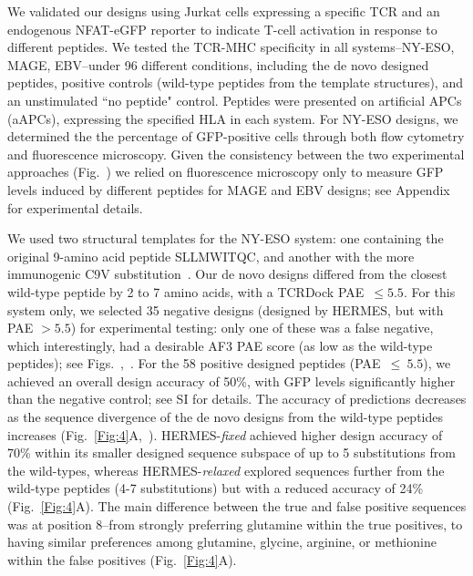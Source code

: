 We validated our designs using Jurkat cells expressing {a specific} TCR {and an endogenous}
NFAT-eGFP reporter to indicate T-cell activation in response to different peptides. We tested the
TCR-MHC specificity in all systems--NY-ESO, MAGE, EBV--under 96 different conditions, including the
{de novo} designed peptides, positive controls (wild-type peptides from the template structures),
and an unstimulated ``no peptide" control. Peptides were presented on artificial APCs (aAPCs),
expressing the specified HLA in each system. For NY-ESO designs, we determined the {the percentage
of GFP-positive cells} through both flow cytometry and fluorescence microscopy. Given the
consistency between the two experimental approaches (Fig.~\FlowMicroscopyFigure) we relied on
fluorescence microscopy only to measure GFP levels induced by different peptides for MAGE and EBV
designs; see Appendix for experimental details.

We used two structural templates for the NY-ESO system: one containing the original 9-amino acid
peptide SLLMWITQC, and another with the more immunogenic C9V
substitution~\cite{Chen2000-vq,Chen2005-jk}. Our {de novo} designs differed from the closest
wild-type peptide by 2 to 7 amino acids, with a TCRDock PAE~$\leq 5.5$. For this system only, we
selected 35 negative designs (designed by HERMES, but with PAE $> 5.5$) for experimental testing:
only one of these was a false negative, which interestingly, had a desirable AF3 PAE score (as low
as the wild-type peptides); see Figs.~\DesignTCRDockAFScatterFigure,~\DesignExpNyesoFigure. For the
58 positive designed peptides (PAE~$\leq~5.5$), we achieved an overall design accuracy of 50\%, with
GFP levels significantly higher than the negative control; see SI for details. The accuracy of
predictions decreases as the sequence divergence of the {de novo} designs from the wild-type
peptides increases (Fig.~\ref{Fig:4}A,~\DesignExpNyesoFigure). HERMES-{\em fixed} achieved higher
design accuracy of 70\% within its smaller designed sequence subspace of up to 5 substitutions from
the wild-types, whereas HERMES-{\em relaxed} explored sequences further from the wild-type peptides
(4-7 substitutions) but with a reduced accuracy of 24\% (Fig.~\ref{Fig:4}A). The main difference
between the true and false positive sequences was at position 8--from strongly preferring glutamine
within the true positives, to having similar preferences among glutamine, glycine, arginine, or
methionine within the false positives (Fig.~\ref{Fig:4}A).

